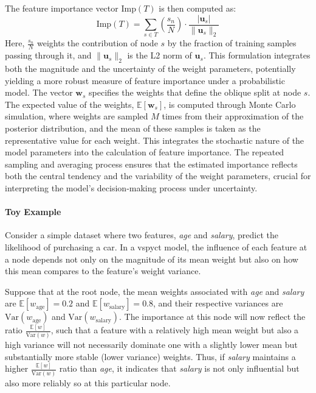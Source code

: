 \documentclass[3p,review,authoryear]{elsarticle}
\begin{document}
The feature importance vector \(\text{Imp}(T)\) is then computed as:
\begin{equation}\label{eq:fimp}
\text{Imp}(T) = \sum_{s \in T} \left( \frac{s_n}{N} \right) \cdot \frac{|\mathbf{u}_s|}{\|\mathbf{u}_s\|_2}
\end{equation}
Here, \(\frac{s_n}{N}\) weights the contribution of node \(s\) by the fraction of training samples passing through it, and \(\|\mathbf{u}_s\|_2\) is the L2 norm of \(\mathbf{u}_s\).
This formulation integrates both the magnitude and the uncertainty of the weight parameters, potentially yielding a more robust measure of feature importance under a probabilistic model.
The vector $\mathbf{w}_s$ specifies the weights that define the oblique split at node $s$.
The expected value of the weights, $\mathbb{E}[\mathbf{w}_s]$, is computed through Monte Carlo simulation, where weights are sampled $M$ times from their approximation of the posterior distribution, and the mean of these samples is taken as the representative value for each weight.
This integrates the stochastic nature of the model parameters into the calculation of feature importance.
The repeated sampling and averaging process ensures that the estimated importance reflects both the central tendency and the variability of the weight parameters, crucial for interpreting the model's decision-making process under uncertainty.


\paragraph{Toy Example}
Consider a simple dataset where two features, \textit{age} and \textit{salary}, predict the likelihood of purchasing a car.
In a \gls{vspyct} model, the influence of each feature at a node depends not only on the magnitude of its mean weight but also on how this mean compares to the feature’s weight variance.

Suppose that at the root node, the mean weights associated with \textit{age} and \textit{salary} are \( \mathbb{E}[w_{\text{age}}] = 0.2 \) and \( \mathbb{E}[w_{\text{salary}}] = 0.8 \), and their respective variances are \( \text{Var}(w_{\text{age}}) \) and \( \text{Var}(w_{\text{salary}}) \).
The importance at this node will now reflect the ratio \( \frac{\mathbb{E}[w]}{\text{Var}(w)} \), such that a feature with a relatively high mean weight but also a high variance will not necessarily dominate one with a slightly lower mean but substantially more stable (lower variance) weights.
Thus, if \textit{salary} maintains a higher \(\frac{\mathbb{E}[w]}{\text{Var}(w)}\) ratio than \textit{age}, it indicates that \textit{salary} is not only influential but also more reliably so at this particular node.
\end{document}
